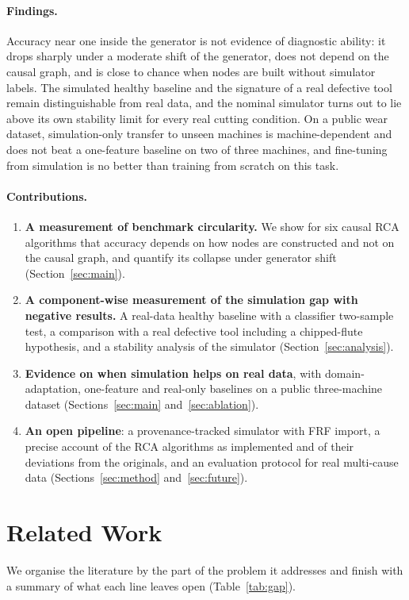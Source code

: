 \documentclass[11pt]{article}
\begin{document}
\paragraph{Findings.}
Accuracy near one inside the generator is not evidence of diagnostic ability: it drops sharply under a moderate shift of the generator, does not depend on the causal graph, and is close to chance when nodes are built without simulator labels.
The simulated healthy baseline and the signature of a real defective tool remain distinguishable from real data, and the nominal simulator turns out to lie above its own stability limit for every real cutting condition.
On a public wear dataset, simulation-only transfer to unseen machines is machine-dependent and does not beat a one-feature baseline on two of three machines, and fine-tuning from simulation is no better than training from scratch on this task.

\paragraph{Contributions.}
\begin{enumerate}
\item \textbf{A measurement of benchmark circularity.} We show for six causal RCA algorithms that accuracy depends on how nodes are constructed and not on the causal graph, and quantify its collapse under generator shift (Section~\ref{sec:main}).
\item \textbf{A component-wise measurement of the simulation gap with negative results.} A real-data healthy baseline with a classifier two-sample test, a comparison with a real defective tool including a chipped-flute hypothesis, and a stability analysis of the simulator (Section~\ref{sec:analysis}).
\item \textbf{Evidence on when simulation helps on real data}, with domain-adaptation, one-feature and real-only baselines on a public three-machine dataset (Sections~\ref{sec:main} and~\ref{sec:ablation}).
\item \textbf{An open pipeline}: a provenance-tracked simulator with FRF import, a precise account of the RCA algorithms as implemented and of their deviations from the originals, and an evaluation protocol for real multi-cause data (Sections~\ref{sec:method} and~\ref{sec:future}).
\end{enumerate}

\section{Related Work}\label{sec:related}
We organise the literature by the part of the problem it addresses and finish with a summary of what each line leaves open (Table~\ref{tab:gap}).
\end{document}

